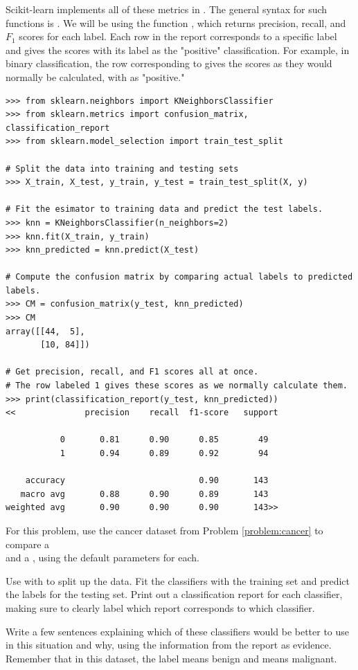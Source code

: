 Scikit-learn implements all of these metrics in .
The general syntax for such functions is .
We will be using the function , which returns precision, recall, and $F_1$ scores for each label.
Each row in the report corresponds to a specific label and gives the scores with its label as the "positive" classification.
For example, in binary classification, the row corresponding to  gives the scores as they would normally be calculated, with  as "positive."

\begin{lstlisting}
>>> from sklearn.neighbors import KNeighborsClassifier
>>> from sklearn.metrics import confusion_matrix, classification_report
>>> from sklearn.model_selection import train_test_split

# Split the data into training and testing sets
>>> X_train, X_test, y_train, y_test = train_test_split(X, y)

# Fit the esimator to training data and predict the test labels.
>>> knn = KNeighborsClassifier(n_neighbors=2)
>>> knn.fit(X_train, y_train)
>>> knn_predicted = knn.predict(X_test)

# Compute the confusion matrix by comparing actual labels to predicted labels.
>>> CM = confusion_matrix(y_test, knn_predicted)
>>> CM
array([[44,  5],
       [10, 84]])

# Get precision, recall, and F1 scores all at once.
# The row labeled 1 gives these scores as we normally calculate them.
>>> print(classification_report(y_test, knn_predicted))
<<              precision    recall  f1-score   support

           0       0.81      0.90      0.85        49
           1       0.94      0.89      0.92        94

    accuracy                           0.90       143
   macro avg       0.88      0.90      0.89       143
weighted avg       0.90      0.90      0.90       143>>
\end{lstlisting}

\begin{problem} %
For this problem, use the cancer dataset from Problem \ref{problem:cancer} to compare a \\  and a , using the default parameters for each.

Use  with  to split up the data.
Fit the classifiers with the training set and predict the labels for the testing set.
Print out a classification report for each classifier, making sure to clearly label which report corresponds to which classifier.

Write a few sentences explaining which of these classifiers would be better to use in this situation and why, using the information from the report as evidence.
Remember that in this dataset, the label  means benign and  means malignant.
\label{problem:validation}
\end{problem}

